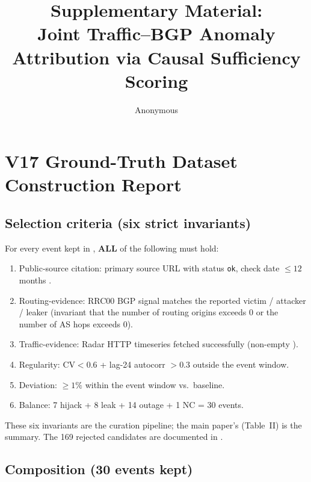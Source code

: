 \documentclass[sigcomm,nonatbib]{acmart}
\title{Supplementary Material:\\
Joint Traffic--BGP Anomaly Attribution via Causal Sufficiency Scoring}
\author{Anonymous}
\affiliation{%
 \institution{Anonymous Institution}
 \city{Anonymous}
 \state{XX}
 \country{Anon}
}
\newcommand{\rrc}{RRC00}
\begin{document}
\maketitle


\section{V17 Ground-Truth Dataset Construction Report}
\label{sec:s17--report}

\subsection{Selection criteria (six strict invariants)}
\label{sec:s17-criteria}

For every event kept in , \textbf{ALL} of the following must hold:

\begin{enumerate}
\itemsep0pt
\item Public-source citation: primary source URL with status
 \texttt{ok}, check date $\leq 12$ months
 .
\item Routing-evidence: \rrc{} BGP signal matches the reported
 victim / attacker / leaker (invariant that
 the number of routing origins exceeds 0 or
 the number of AS hops exceeds 0).
\item Traffic-evidence: \cf{} Radar HTTP timeseries fetched
 successfully (non-empty
 ).
\item Regularity: $\mathrm{CV}<0.6$ + lag-24 autocorr
 $>0.3$ outside the event window.
\item Deviation: $\geq 1\%$ within the event window
 vs.\ baseline.
\item Balance: 7 hijack + 8 leak + 14 outage + 1 NC = 30
 events.
\end{enumerate}

These six invariants are the curation pipeline; the main
paper's  (Table~II) is the
summary. The 169 rejected candidates are documented in
.

\subsection{Composition (30 events kept)}
\end{document}
